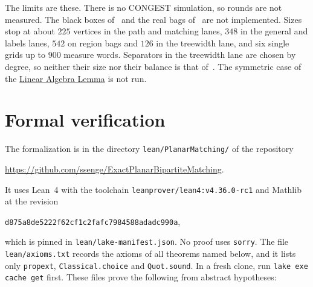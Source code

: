 \documentclass[11pt]{article}
\theoremstyle{definition}
\theoremstyle{remark}
\theoremstyle{plain}
\newcommand{\LemLA}{\hyperref[lem:la]{Linear Algebra Lemma}}
\begin{document}
The limits are these. There is no CONGEST simulation, so rounds are not measured. The black boxes of~\cite{P20} and the real bags of~\cite{LP19} are not implemented. Sizes stop at about $225$ vertices in the path and matching lanes, $348$ in the general and labels lanes, $542$ on region bags and $126$ in the treewidth lane, and six single grids up to $900$ measure words. Separators in the treewidth lane are chosen by degree, so neither their size nor their
balance is that of~\cite{IKNS22}. The symmetric case of the \LemLA{} is not run.

\section{Formal verification}\label{sec:lean}

The formalization is in the directory \texttt{lean/PlanarMatching/} of the repository
\begin{center}
\url{https://github.com/ssenge/ExactPlanarBipartiteMatching}.
\end{center}
It uses Lean~4 with the toolchain \texttt{leanprover/lean4:v4.36.0-rc1} and Mathlib at the revision
\begin{center}
\texttt{d875a8de5222f62cf1c2fafc7984588adadc990a},
\end{center}
which is pinned in \texttt{lean/lake-manifest.json}. No proof uses \texttt{sorry}. The file \texttt{lean/axioms.txt} records the axioms of all theorems named below, and it lists only \texttt{propext}, \texttt{Classical.choice} and \texttt{Quot.sound}. In a fresh clone, run
\texttt{lake exe cache get} first. These files prove the following from abstract hypotheses:
\end{document}
